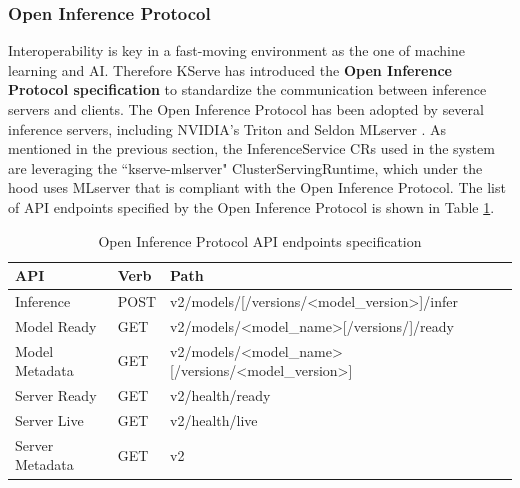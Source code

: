 \subsubsection{Open Inference Protocol}

Interoperability is key in a fast-moving environment as the one of machine learning and AI. 
Therefore KServe has introduced the \textbf{Open Inference Protocol specification} to standardize the communication between inference servers and clients. 
The Open Inference Protocol has been adopted by several inference servers, including NVIDIA's Triton and Seldon MLserver \cite{kserve_oip}.
As mentioned in the previous section, the InferenceService CRs used in the system are leveraging the ``kserve-mlserver" ClusterServingRuntime, which under the hood uses MLserver that is compliant with the Open Inference Protocol.
The list of API endpoints specified by the Open Inference Protocol is shown in Table \ref{tab:oip_endpoints}.

% 

\begin{table}[h!]
\centering
\begin{tabular}{|l|l|l|}
\hline
\textbf{API}    & \textbf{Verb} & \textbf{Path}                                                                                         \\ \hline
Inference       & POST          & v2/models/{[}/versions/\textless{}model\_version\textgreater{}{]}/infer                               \\ \hline
Model Ready     & GET           & v2/models/\textless{}model\_name\textgreater{}{[}/versions/{]}/ready                                  \\ \hline
Model Metadata  & GET           & v2/models/\textless{}model\_name\textgreater{}{[}/versions/\textless{}model\_version\textgreater{}{]} \\ \hline
Server Ready    & GET           & v2/health/ready                                                                                       \\ \hline
Server Live     & GET           & v2/health/live                                                                                        \\ \hline
Server Metadata & GET           & v2                                                                                                    \\ \hline
\end{tabular}
\caption{Open Inference Protocol API endpoints specification \cite{kserve_oip}}
\label{tab:oip_endpoints}
\end{table}

